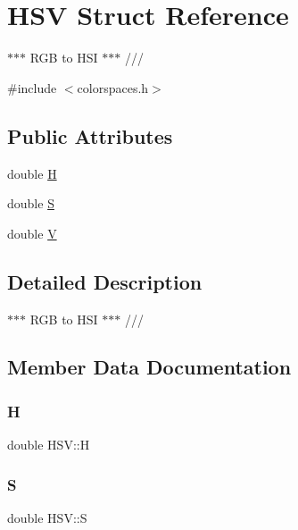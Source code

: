 \hypertarget{struct_h_s_v}{}\section{H\+SV Struct Reference}
\label{struct_h_s_v}


$\ast$$\ast$$\ast$ R\+GB to H\+SI $\ast$$\ast$$\ast$ ///  




{\ttfamily \#include $<$colorspaces.\+h$>$}

\subsection*{Public Attributes}
\begin{DoxyCompactItemize}
\item 
double \hyperlink{struct_h_s_v_aa5298b83b6f6ad2da2f2921c3e3202e7}{H}
\item 
double \hyperlink{struct_h_s_v_a246df45210c6b7c61056158d1596676d}{S}
\item 
double \hyperlink{struct_h_s_v_aade636e6ce581e93de5374f0e5d77d7c}{V}
\end{DoxyCompactItemize}


\subsection{Detailed Description}
$\ast$$\ast$$\ast$ R\+GB to H\+SI $\ast$$\ast$$\ast$ /// 

\subsection{Member Data Documentation}
\mbox{\label{struct_h_s_v_aa5298b83b6f6ad2da2f2921c3e3202e7}} 
\subsubsection{\texorpdfstring{H}{H}}
{\footnotesize\ttfamily double H\+S\+V\+::H}

\mbox{\label{struct_h_s_v_a246df45210c6b7c61056158d1596676d}} 
\subsubsection{\texorpdfstring{S}{S}}
{\footnotesize\ttfamily double H\+S\+V\+::S}

